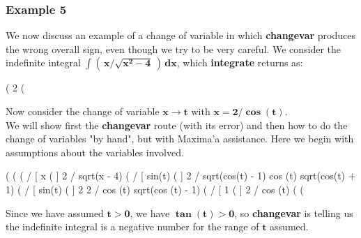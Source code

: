 \documentclass[12pt]{article}
\begin{document}
\subsubsection*{Example 5}
We now discuss an example  of a change of variable in which \textbf{changevar} 
   produces the wrong overall sign, even though we try to be very careful.
We consider the indefinite integral $\mathbf{\int \left( \,x/\sqrt{x^{2}-4} \, \right)\, dx}$, which
  \textbf{integrate} returns as:
\begin{myVerbatim}
(%
                                       2
(%
\end{myVerbatim}
Now consider the change of variable $\mathbf{x \rightarrow t}$ with
 $\mathbf{x = 2/\boldsymbol{\cos}(t)}$.\\

\noindent We will show first the \textbf{changevar} route (with its error) and then
  how to do the change of variables "by hand", but with Maxima'a assistance.
Here we begin with assumptions about the variables involved.
\begin{myVerbatim}
(%
(%
(%
                               /
                               [      x
(%
                               ]       2
                               / sqrt(x  - 4)
(%
                    /
                    [                  sin(t)
(%
                    ]                     2
                    / sqrt(cos(t) - 1) cos (t) sqrt(cos(t) + 1)
(%
                            /
                            [          sin(t)
(%
                            ]    2            2
                            / cos (t) sqrt(cos (t) - 1)
(%
                                   /
                                   [    1
(%
                                   ]    2
                                   / cos (t)
(%
(%
\end{myVerbatim}
Since we have assumed $\mathbf{t > 0}$, we have $\mathbf{\boldsymbol{\tan}(t) > 0}$,
 so \textbf{changevar} is telling us the indefinite integral is a negative number
 for the range of $\mathbf{t}$   assumed.\\
  
\end{document}
